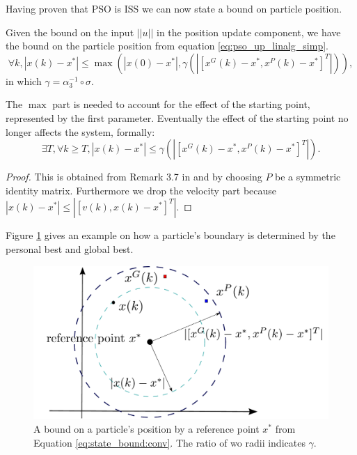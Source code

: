Having proven that PSO is ISS we can now state a bound on particle position.

\begin{mycoro}
\label{coro:state_bound}
Given the bound on the input $ || u || $ in the position update component, we have the bound on the particle position from equation \eqref{eq:pso_up_linalg_simp}.
\begin{equation}
\label{eq:state_bound}
\forall k, 
| x(k) - x^{*} | \leq \max ( | x(0) - x^{*} | , \gamma ( | [ x^{G}(k) - x^{*}, x^{P}(k) - x^{*} ]^{T} | ) ),
\end{equation}
in which $ \gamma = \alpha_{3}^{-1} \circ \sigma $.

The $ \max $ part is needed to account for the effect of the starting point, represented by the first parameter. Eventually the effect of the starting point no longer affects the system, formally:
\begin{equation}
\label{eq:state_bound:conv}
\exists T, \forall k \geq T, 
|  x(k) - x^{*} | \leq \gamma ( | [ x^{G}(k) - x^{*}, x^{P}(k) - x^{*} ]^{T} | ).
\end{equation}
\begin{proof}
This is obtained from Remark 3.7 in \cite{Jiang2001857} and by choosing $ P $ be a symmetric identity matrix.
Furthermore we drop the velocity part because $ | x(k) - x^{*} | \leq | [ v(k), x(k) - x^{*} ]^{T} | $.
\end{proof}
\end{mycoro}

Figure \ref{fig:boundary} gives an example on how a particle's boundary is determined by the personal best and global best.

\begin{figure}
\centering
\includegraphics[width=0.9\linewidth]{./figure/boundary}
\caption{A bound on a particle's position by a reference point $ x^{*} $ from Equation \ref{eq:state_bound:conv}.
The ratio of wo radii indicates $ \gamma $.}
\label{fig:boundary}
\end{figure}

